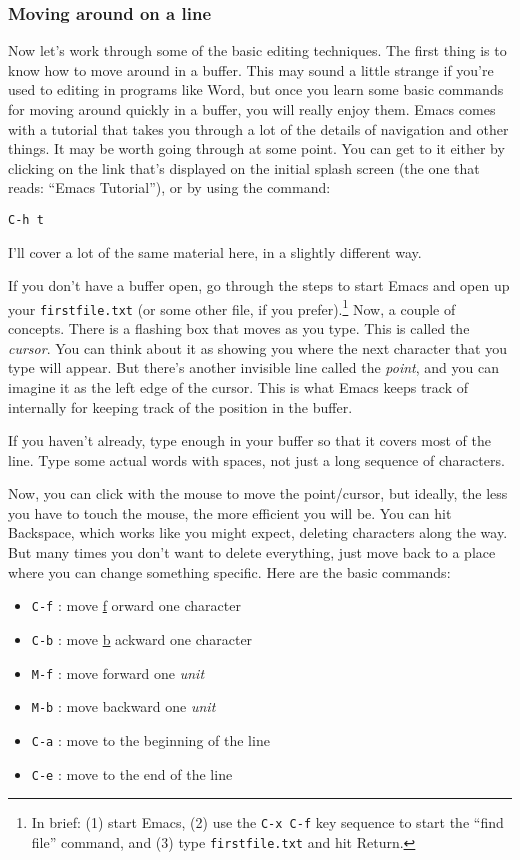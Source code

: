 \documentclass{article}
\begin{document}
\subsubsection{Moving around on a line}
\label{sec-4-2-12}

Now let's work through some of the basic editing techniques. The first thing is to know how to move around in a buffer.  This may sound a little strange if you're used to editing in programs like Word, but once you learn some basic commands for moving around quickly in a buffer, you will really enjoy them. Emacs comes with a tutorial that takes you through a lot of the details of navigation and other things.  It may be worth going through at some point.  You can get to it either by clicking on the link that's displayed on the initial splash screen (the one that reads: ``Emacs Tutorial''), or by using the command:


\begin{verbatim}
C-h t
\end{verbatim}

I'll cover a lot of the same material here, in a slightly different way.

If you don't have a buffer open, go through the steps to start Emacs and open up your \texttt{firstfile.txt} (or some other file, if you prefer).\footnote{In brief: (1) start Emacs, (2) use the \texttt{C-x C-f} key sequence to start the ``find file'' command, and (3) type \texttt{firstfile.txt} and hit Return.
 }  Now, a couple of concepts.  There is a flashing box that moves as you type. This is called the \emph{cursor}.  You can think about it as showing you where the next character that you type will appear.  But there's another invisible line called the \emph{point}, and you can imagine it as the left edge of the cursor.  This is what Emacs keeps track of internally for keeping track of the position in the buffer.

If you haven't already, type enough in your buffer so that it covers most of the line.  Type some actual words with spaces, not just a long sequence of characters.

Now, you can click with the mouse to move the point/cursor, but ideally, the less you have to touch the mouse, the more efficient you will be. You can hit Backspace, which works like you might expect, deleting characters along the way.  But many times you don't want to delete everything, just move back to a place where you can change something specific. Here are the basic commands:

\begin{itemize}
\item \texttt{C-f}  : move \underline{f} orward one character
\item \texttt{C-b}  : move \underline{b} ackward one character
\item \texttt{M-f}  : move forward one \emph{unit}
\item \texttt{M-b}  : move backward one \emph{unit}
\item \texttt{C-a}  : move to the beginning of the line
\item \texttt{C-e}  : move to the end of the line
\end{itemize}
\end{document}

